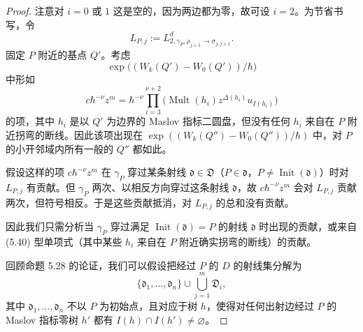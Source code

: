 \begin{proof}
注意对 $i=0$ 或 $1$ 这是空的，因为两边都为零，故可设 $i=2$。为节省书写，令
\[
  L_{P,j}:=L^d_{2,\gamma_P,\rho_{j+1}\to\sigma_{j,j+1}}.
\]
固定 $P$ 附近的基点 $Q'$。考虑
\[
  \exp\bigl((W_k(Q')-W_0(Q'))/\hbar\bigr)
\]
中形如
\begin{equation}
  c\hbar^{-\nu}z^m=\hbar^{-\nu}\prod_{i=3}^{\nu+2}\bigl(\operatorname{Mult}(h_i)z^{\Delta(h_i)}u_{I(h_i)}\bigr) \tag{5.40}
\end{equation}
的项，其中 $h_i$ 是以 $Q'$ 为边界的 Maslov 指标二圆盘，但没有任何 $h_i$ 来自在 $P$ 附近拐弯的断线。因此该项出现在 $\exp((W_k(Q'')-W_0(Q''))/\hbar)$ 中，对 $P$ 的小开邻域内所有一般的 $Q''$ 都如此。


假设这样的项 $c\hbar^{-\nu}z^m$ 在 $\gamma_P$ 穿过某条射线 $\mathfrak d\in\mathfrak D$（$P\in\mathfrak d$，$P\ne\operatorname{Init}(\mathfrak d)$）时对 $L_{P,j}$ 有贡献。但 $\gamma_P$ 两次、以相反方向穿过这条射线 $\mathfrak d$，故 $c\hbar^{-\nu}z^m$ 会对 $L_{P,j}$ 贡献两次，但符号相反。于是这些贡献抵消，对 $L_{P,j}$ 的总和没有贡献。

因此我们只需分析当 $\gamma_P$ 穿过满足 $\operatorname{Init}(\mathfrak d)=P$ 的射线 $\mathfrak d$ 时出现的贡献，或来自 (5.40) 型单项式（其中某些 $h_i$ 来自在 $P$ 附近确实拐弯的断线）的贡献。

回顾命题 5.28 的论证，我们可以假设把经过 $P$ 的 $D$ 的射线集分解为
\[
  \{\mathfrak d_1,\ldots,\mathfrak d_n\}\cup\bigcup_{j=1}^{m}\mathfrak D_i,
\]
其中 $\mathfrak d_1,\ldots,\mathfrak d_n$ 不以 $P$ 为初始点，且对应于树 $h$，使得对任何出射边经过 $P$ 的 Maslov 指标零树 $h'$ 都有 $I(h)\cap I(h')\ne\varnothing$。



\end{proof}
